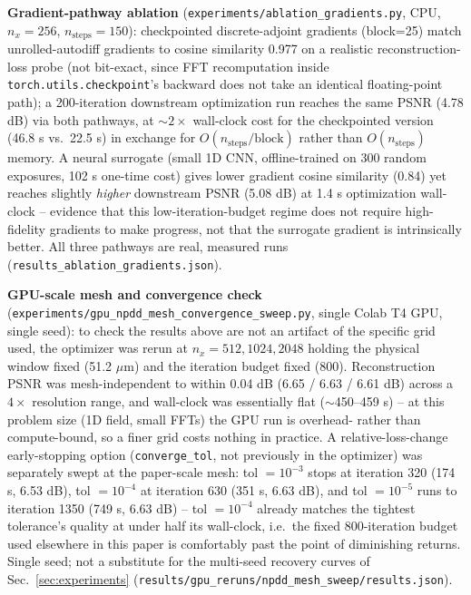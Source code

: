 \documentclass[conference]{IEEEtran}
\begin{document}
\textbf{Gradient-pathway ablation} (\texttt{experiments/ablation\_gradients.py},
CPU, $n_x{=}256$, $n_\text{steps}{=}150$): checkpointed discrete-adjoint
gradients (block=25) match unrolled-autodiff gradients to cosine similarity
0.977 on a realistic reconstruction-loss probe (not bit-exact, since FFT
recomputation inside \texttt{torch.utils.checkpoint}'s backward does not
take an identical floating-point path); a 200-iteration downstream
optimization run reaches the same PSNR (4.78 dB) via both pathways, at
$\sim2\times$ wall-clock cost for the checkpointed version (46.8 s vs.\
22.5 s) in exchange for $O(n_\text{steps}/\text{block})$ rather than
$O(n_\text{steps})$ memory. A neural surrogate (small 1D CNN, offline-trained
on 300 random exposures, 102 s one-time cost) gives lower gradient cosine
similarity (0.84) yet reaches slightly \emph{higher} downstream PSNR (5.08 dB)
at 1.4 s optimization wall-clock -- evidence that this low-iteration-budget
regime does not require high-fidelity gradients to make progress, not that
the surrogate gradient is intrinsically better. All three pathways are real,
measured runs (\texttt{results\_ablation\_gradients.json}).

\textbf{GPU-scale mesh and convergence check}
(\texttt{experiments/gpu\_npdd\_mesh\_convergence\_sweep.py}, single Colab T4
GPU, single seed): to check the results above are not an artifact of the
specific grid used, the optimizer was rerun at $n_x = 512, 1024, 2048$
holding the physical window fixed (51.2 $\mu$m) and the iteration budget
fixed (800). Reconstruction PSNR was mesh-independent to within 0.04 dB
(6.65 / 6.63 / 6.61 dB) across a $4\times$ resolution range, and wall-clock
was essentially flat ($\sim$450--459 s) -- at this problem size (1D field,
small FFTs) the GPU run is overhead- rather than compute-bound, so a finer
grid costs nothing in practice. A relative-loss-change early-stopping option
(\texttt{converge\_tol}, not previously in the optimizer) was separately
swept at the paper-scale mesh: tol $=10^{-3}$ stops at iteration 320 (174 s,
6.53 dB), tol $=10^{-4}$ at iteration 630 (351 s, 6.63 dB), and tol
$=10^{-5}$ runs to iteration 1350 (749 s, 6.63 dB) -- tol $=10^{-4}$ already
matches the tightest tolerance's quality at under half its wall-clock, i.e.\
the fixed 800-iteration budget used elsewhere in this paper is comfortably
past the point of diminishing returns. Single seed; not a substitute for the
multi-seed recovery curves of Sec.~\ref{sec:experiments}
(\texttt{results/gpu\_reruns/npdd\_mesh\_sweep/results.json}).
\end{document}

